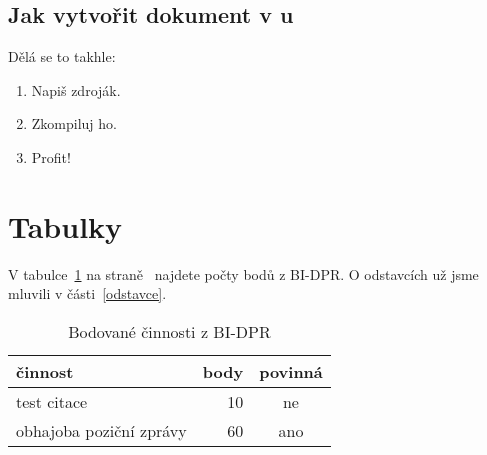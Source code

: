 \documentclass[a4paper]{article}
\begin{document}
	\subsection{Jak vytvořit dokument v {\XeLaTeX}u}
	
	Dělá se to takhle:
	\begin{enumerate}
	    \item Napiš zdroják.
	    \item Zkompiluj ho.
	    \item Profit!
	\end{enumerate}
	
	
	\section{Tabulky}
	
	V tabulce~\ref{body} na straně~\pageref{body} najdete počty bodů z BI-DPR. O odstavcích už jsme mluvili v části~\ref{odstavce}.
	
	\begin{table}[h!t] %
	    \caption[Body z BI-DPR]{Bodované činnosti z BI-DPR}\label{body}
	    \begin{center}
    	    \begin{tabular}{p{3.5cm}|r|c}
    	        činnost & body & povinná\\ \hline \hline
    	        test citace & 10 & ne\\ \hline
    	        obhajoba poziční zprávy & 60 & ano\\
    	    \end{tabular}
	    \end{center}
	\end{table}
	
	
	
	
	
\end{document}
